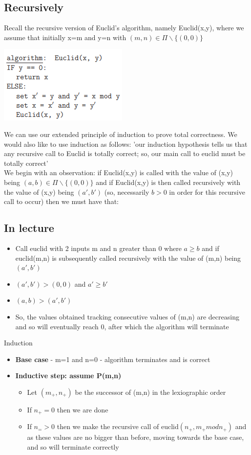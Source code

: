 \documentclass{article}[18pt]
\begin{document}
\subsection{Recursively}
Recall the recursive version of Euclid's algorithm, namely Euclid(x,y), where we assume that initially x=m and y=n with $(m,n)\in \Pi \backslash \{(0,0)\}$
\begin{center}
	\includegraphics[scale=0.7]{euclid}
\end{center}
We can use our extended principle of induction to prove total correctness. We would also like to use induction as follows: 'our induction hypothesis tells us that any recursive call to Euclid is totally correct; so, our main call to euclid must be totally correct'\\
We begin with an observation: if Euclid(x,y) is called with the value of (x,y) being $(a,b)\in \Pi \backslash \{(0,0)\}$ and if Euclid(x,y) is then called recursively with the value of (x,y) being $(a',b')$ (so, necessarily $b>0$ in order for this recursive call to occur) then we must have that:
\subsection{In lecture}
\begin{itemize}
	\item Call euclid with 2 inputs m and n greater than 0 where $a\geqslant b$ and if euclid(m,n) is subsequently called recursively with the value of (m,n) being $(a',b')$
	\item $(a',b')>(0,0)$ and $a'\geqslant b'$
	\item $(a,b)>(a',b')$
	\item So, the values obtained tracking consecutive values of (m,n) are decreasing and so will eventually reach 0, after which the algorithm will terminate
\end{itemize}
Induction
\begin{itemize}
	\item \textbf{Base case} - m=1 and n=0 - algorithm terminates and is correct
	\item \textbf{Inductive step: assume P(m,n)}
	\begin{itemize}
		\item Let $(m_+,n_+)$ be the successor of (m,n) in the lexiographic order
		\item If $n_+=0$ then we are done
		\item If $n_=>0$ then we make the recursive call of euclid$(n_+,m_+ mod n_+)$ and as these values are no bigger than before, moving towards the base case, and so will terminate correctly
	\end{itemize}
\end{itemize}
\end{document}
